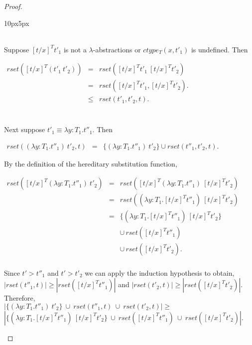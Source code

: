 \begin{proof}
\begin{changemargin}{10px}{5px}
\begin{itemize}
  \ \\
  \noindent
  Suppose $[t/x]^T t'_1$ is not a $\lambda$-abstractions or $ctype_T(x,t'_1)$ is undefined.  Then
  \begin{center}
    \begin{math}
      \begin{array}{lll}
        rset([t/x]^T (t'_1\ t'_2)) & = & rset([t/x]^T t'_1\ [t/x]^T t'_2)\\
        & = & rset([t/x]^T t'_1, [t/x]^T t'_2).\\
        & \leq & rset(t'_1, t'_2, t).\\
      \end{array}
    \end{math}
  \end{center}
  
  \ \\
  Next suppose $t'_1 \equiv \lambda y:T_1.t''_1$.  Then 
  \begin{center}
    \begin{math}
      \begin{array}{lll}
        rset((\lambda y:T_1.t''_1)\ t'_2, t) & = & \{ (\lambda y:T_1.t''_1)\ t'_2\} \cup rset(t''_1, t'_2, t).
      \end{array}
    \end{math}
  \end{center}
  By the definition of the hereditary substitution function,
  \begin{center}
    \begin{math}
      \begin{array}{lll}
        rset([t/x]^T (\lambda y:T_1.t''_1)\ t'_2) & = & rset([t/x]^T (\lambda y:T_1.t''_1)\ [t/x]^T t'_2)\\
        & = & rset((\lambda y:T_1.[t/x]^T t''_1)\ [t/x]^T t'_2)\\
        & = & \{(\lambda y:T_1.[t/x]^T t''_1)\ [t/x]^T t'_2\} \\
        &   & \cup\,rset([t/x]^T t''_1)\\
        &   & \cup\,rset([t/x]^T t'_2).\\
        
      \end{array}
    \end{math}
  \end{center}
  Since $t' > t''_1$ and $t' > t'_2$ we can apply the induction hypothesis to obtain,
  $|rset(t''_1, t)| \geq |rset([t/x]^T t''_1)|$ and $|rset(t'_2,t)| \geq |rset([t/x]^T t'_2)|$.  Therefore, \\
  $|\{ (\lambda y:T_1.t''_1)\ t'_2\}\ \cup\ rset(t''_1,t)\ \cup\ rset(t'_2,t)| \geq $ 
  $|\{(\lambda y:T_1.[t/x]^T t''_1)\ [t/x]^T t'_2\}\ \cup\ rset([t/x]^T t''_1)\ \cup\ rset([t/x]^T t'_2)|$.
\end{itemize}
\end{changemargin}
\end{proof}

